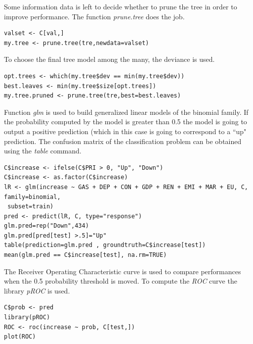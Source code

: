 \documentclass{book}
\begin{document}
Some information data is left to decide whether to prune the tree in order to improve performance. The function \textit{prune.tree} does the job.

\begin{verbatim}
valset <- C[val,]
my.tree <- prune.tree(tre,newdata=valset)
\end{verbatim}

To choose the final tree model among the many, the deviance is used.

\begin{verbatim}
opt.trees <- which(my.tree$dev == min(my.tree$dev))
best.leaves <- min(my.tree$size[opt.trees])
my.tree.pruned <- prune.tree(tre,best=best.leaves)
\end{verbatim}

Function \textit{glm} is used to build generalized linear models of the binomial family. If the probability computed by the model is greater than 0.5 the model is going to output a positive prediction (which in this case is going to correspond to a ``up" prediction. The confusion matrix of the classification problem can be obtained using the \textit{table} command. 

\begin{verbatim}
C$increase <- ifelse(C$PRI > 0, "Up", "Down")
C$increase <- as.factor(C$increase)
lR <- glm(increase ~ GAS + DEP + CON + GDP + REN + EMI + MAR + EU, C, family=binomial,
 subset=train)
pred <- predict(lR, C, type="response")
glm.pred=rep("Down",434)
glm.pred[pred[test] >.5]="Up"
table(prediction=glm.pred , groundtruth=C$increase[test])
mean(glm.pred == C$increase[test], na.rm=TRUE)
\end{verbatim}

The Receiver Operating Characteristic curve is used to compare performances when the 0.5 probability threshold is moved. To compute the \textit{ROC} curve the library \textit{pROC} is used.

\begin{verbatim}
C$prob <- pred
library(pROC)
ROC <- roc(increase ~ prob, C[test,])
plot(ROC)
\end{verbatim}

{}

\end{document}
